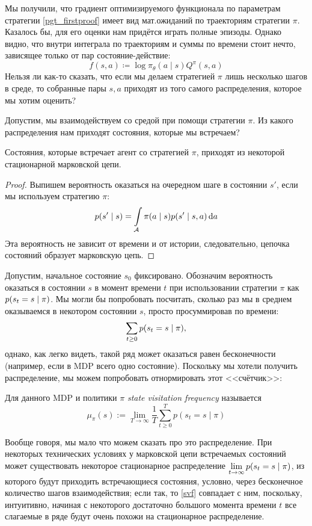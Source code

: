 Мы получили, что градиент оптимизируемого функционала по параметрам стратегии \eqref{pgt_firstproof} имеет вид мат.ожиданий по траекториям стратегии $\pi$. Казалось бы, для его оценки нам придётся играть полные эпизоды. Однако видно, что внутри интеграла по траекториям и суммы по времени стоит нечто, зависящее только от пар состояние-действие:
$$f(s, a) \coloneqq \log \pi_\theta (a \mid s) Q^\pi(s, a)$$
Нельзя ли как-то сказать, что если мы делаем стратегией $\pi$ лишь несколько шагов в среде, то собранные пары $s, a$ приходят из того самого распределения, которое мы хотим оценить?

Допустим, мы взаимодействуем со средой при помощи стратегии $\pi$. Из какого распределения нам приходят состояния, которые мы встречаем?
\begin{proposition}
Состояния, которые встречает агент со стратегией $\pi$, приходят из некоторой стационарной марковской цепи.
\begin{proof}
Выпишем вероятность оказаться на очередном шаге в состоянии $s'$, если мы используем стратегию $\pi$:
$$p(s' \mid s) = \int\limits_{\mathcal{A}} \pi(a \mid s)p(s' \mid s, a) \mathop{}\!\mathrm{d} a$$
Эта вероятность не зависит от времени и от истории, следовательно, цепочка состояний образует марковскую цепь.
\end{proof}
\end{proposition}

Допустим, начальное состояние $s_0$ фиксировано. Обозначим вероятность оказаться в состоянии $s$ в момент времени $t$ при использовании стратегии $\pi$ как $p(s_t \HM= s \mid \pi)$. Мы могли бы попробовать посчитать, сколько раз мы в среднем оказываемся в некотором состоянии $s$, просто просуммировав по времени:
$$\sum_{t \ge 0} p(s_t \HM= s \mid \pi),$$
однако, как легко видеть, такой ряд может оказаться равен бесконечности (например, если в MDP всего одно состояние). Поскольку мы хотели получить распределение, мы можем попробовать отнормировать этот <<счётчик>>:

\begin{definition} 
Для данного MDP и политики $\pi$ \emph{state visitation frequency} называется
\begin{equation}\label{svf}
\mu_\pi(s) := \lim_{T \to \infty} \frac{1}{T} \sum_{t \ge 0}^T p(s_t = s \mid \pi)
\end{equation}
\end{definition}

Вообще говоря, мы мало что можем сказать про это распределение. При некоторых технических условиях у марковской цепи встречаемых состояний может существовать некоторое стационарное распределение $\lim\limits_{t \to \infty} p(s_t \HM= s \mid \pi)$, из которого будут приходить встречающиеся состояния, условно, через бесконечное количество шагов взаимодействия; если так, то \eqref{svf} совпадает с ним, поскольку, интуитивно, начиная с некоторого достаточно большого момента времени $t$ все слагаемые в ряде будут очень похожи на стационарное распределение.

